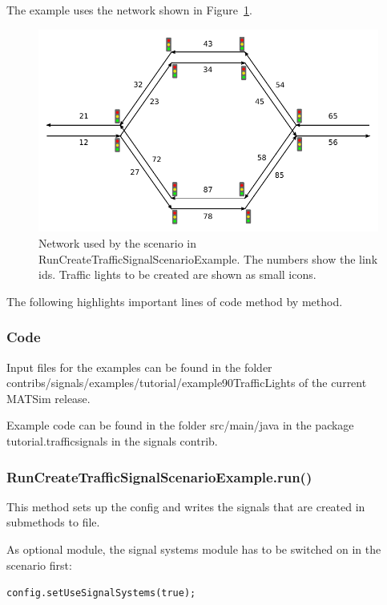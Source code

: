 The example uses the network shown in Figure~\ref{fig:RunCreateTrafficSignalScenarioExampleNetwork}. 

\begin{figure}[htbp]
	\center
	\includegraphics{data/RunCreateTrafficSignalScenarioExampleNetwork}
	\caption{Network used by the scenario in RunCreateTrafficSignalScenarioExample. The numbers show the link ids. Traffic lights to be created are shown as small icons.}
	\label{fig:RunCreateTrafficSignalScenarioExampleNetwork}
\end{figure}

The following highlights important lines of code method by method.

\subsubsection{Code}

Input files for the examples can be found in the folder  contribs/signals/examples/tutorial/example90TrafficLights of the current MATSim release.

Example code can be found in the folder src/main/java in the package tutorial.trafficsignals in the signals contrib.

\subsubsection{RunCreateTrafficSignalScenarioExample.run()}

This method sets up the config and writes the signals that are created in submethods to file.

As optional module, the signal systems module has to be switched on in the scenario first:


\texttt{\nolinebreak config.setUseSignalSystems(true);}

